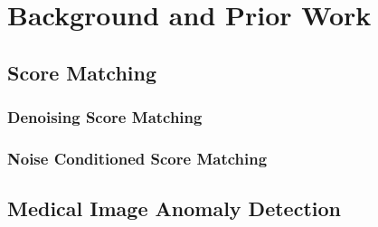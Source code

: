 \chapter{Background and Prior Work}

\section{Score Matching}

\subsection{Denoising Score Matching}

\subsection{Noise Conditioned Score Matching}

\section{Medical Image Anomaly Detection}
